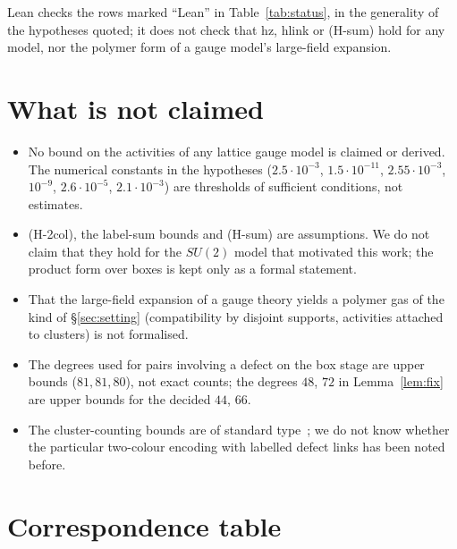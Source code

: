\documentclass[11pt,a4paper]{article}
\theoremstyle{definition}
\theoremstyle{remark}
\DeclareRobustCommand{\lean}[1]{{\ttfamily\renewcommand{\_}{\textunderscore\allowbreak}#1}}
\begin{document}
Lean checks the rows marked ``Lean'' in Table~\ref{tab:status}, in the generality of the hypotheses quoted; it does not check that \lean{hz}, \lean{hlink} or (H-sum) hold for any model, nor the polymer form of a gauge model's large-field expansion.

\section{What is not claimed}\label{sec:notclaimed}
\begin{itemize}[leftmargin=2em]
\item No bound on the activities of any lattice gauge model is claimed or derived. The numerical constants in the hypotheses ($2.5\cdot10^{-3}$, $1.5\cdot10^{-11}$, $2.55\cdot10^{-3}$, $10^{-9}$, $2.6\cdot10^{-5}$, $2.1\cdot10^{-3}$) are thresholds of sufficient conditions, not estimates.
\item (H-2col), the label-sum bounds and (H-sum) are assumptions. We do not claim that they hold for the $SU(2)$ model that motivated this work; the product form over boxes is kept only as a formal statement.
\item That the large-field expansion of a gauge theory yields a polymer gas of the kind of \S\ref{sec:setting} (compatibility by disjoint supports, activities attached to clusters) is not formalised.
\item The degrees used for pairs involving a defect on the box stage are upper bounds ($81,81,80$), not exact counts; the degrees $48$, $72$ in Lemma~\ref{lem:fix} are upper bounds for the decided $44$, $66$.
\item The cluster-counting bounds are of standard type~\cite{KP,Do,Ue}; we do not know whether the particular two-colour encoding with labelled defect links has been noted before.
\end{itemize}

\section{Correspondence table}\label{sec:corr}
\end{document}
